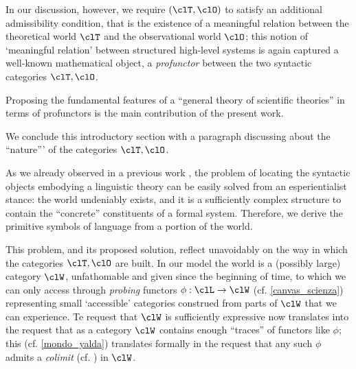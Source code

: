 In our discussion, however, we require $(\clT,\clO)$ to satisfy an additional admissibility condition, that is the existence of a meaningful relation between the theoretical world $\clT$ and the observational world $\clO$; this notion of `meaningful relation' between structured high-level systems is again captured a well-known mathematical object, a \emph{profunctor} \cite{benabou2000distributors} between the two syntactic categories $\clT,\clO$.

Proposing the fundamental features of a ``general theory of scientific theories'' in terms of profunctors is the main contribution of the present work.

\medskip
We conclude this introductory section with a paragraph discussing about the ``nature''' of the categories $\clT,\clO$.

As we already observed in a previous work \cite{catont1}, the problem of locating the syntactic objects embodying a linguistic theory can be easily solved from an esperientialist stance: the world undeniably exists, and it is a sufficiently complex structure to contain the ``concrete'' constituents of a formal system. Therefore, we derive the primitive symbols of language from a portion of the world.

This problem, and its proposed solution, reflect unavoidably on the way in which the categories $\clT,\clO$ are built. In our model the world is a (possibly large) category $\clW$, unfathomable and given since the beginning of time, to which we can only access through \emph{probing} functors $\phi : \clL \to \clW$ (cf. \autoref{canvas_scienza}) representing small `accessible' categories construed from parts of $\clW$ that we can experience. Te request that $\clW$ is sufficiently expressive now translates into the request that as a category $\clW$ contains enough ``traces'' of functors like $\phi$; this (cf. \autoref{mondo_yalda}) translates formally in the request that any such $\phi$ admits a \emph{colimit} (cf. \cite[Ch. 2]{Bor1}) in $\clW$.

